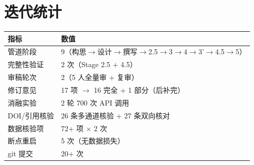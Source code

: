 \documentclass[11pt]{article}
\begin{document}
\section{{\cjkfont 迭代统计}}
\begin{table}[htbp]
\centering
\small
\begin{tabular}{ll}
\hline
{\cjkfont 指标} & {\cjkfont 数值} \\
\hline
{\cjkfont 管道阶段} & 9{\cjkfont （构思}$\rightarrow${\cjkfont 设计}$\rightarrow${\cjkfont 撰写}$\rightarrow$2.5$\rightarrow$3$\rightarrow$4$\rightarrow$3'$\rightarrow$4.5$\rightarrow$5{\cjkfont ）} \\
{\cjkfont 完整性验证} & 2 {\cjkfont 次（}Stage 2.5 + 4.5{\cjkfont ）} \\
{\cjkfont 审稿轮次} & 2{\cjkfont （}5 {\cjkfont 人全量审} + {\cjkfont 复审）} \\
{\cjkfont 修订意见} & 17 {\cjkfont 项} $\rightarrow$ 16 {\cjkfont 完全} + 1 {\cjkfont 部分（后补完）} \\
{\cjkfont 消融实验} & 2 {\cjkfont 轮} 700 {\cjkfont 次} API {\cjkfont 调用} \\
DOI/{\cjkfont 引用核验} & 26 {\cjkfont 条多通道核验} + 27 {\cjkfont 条双向核对} \\
{\cjkfont 数据核验项} & 72+ {\cjkfont 项} $\times$ 2 {\cjkfont 次} \\
{\cjkfont 断点重启} & 5 {\cjkfont 次（无数据损失）} \\
git {\cjkfont 提交} & 20+ {\cjkfont 次} \\
\hline
\end{tabular}
\end{table}
\end{document}
